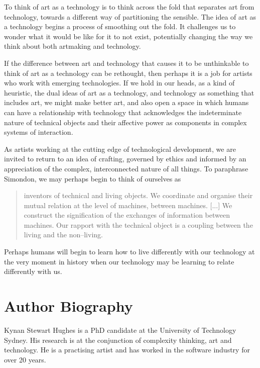 \documentclass[letter:wpaper]{article}
\begin{document}
   To think of art as a technology is to think across the fold that separates art from technology, towards a different way of partitioning the sensible. The idea of art as a technology begins a process of smoothing out the fold. It challenges us to wonder what it would be like for it to not exist, potentially changing the way we think about both artmaking and technology.
    
    If the difference between art and technology that causes it to be unthinkable to think of art as a technology can be rethought, then perhaps it is a job for artists who work with emerging technologies. If we hold in our heads, as a kind of heuristic, the dual ideas of art as a technology, and technology as something that includes art, we might make better art, and also open a space in which humans can have a relationship with technology that acknowledges the indeterminate nature of technical objects and their affective power as components in complex systems of interaction.
    
    As artists working at the cutting edge of technological development, we are invited to return to an idea of crafting, governed by ethics and informed by an appreciation of the complex, interconnected nature of all things. To paraphrase Simondon, we may perhaps begin to think of ourselves as
    
    \begin{quote}
        inventors of technical and living objects. We coordinate and organise their mutual relation at the level of machines, between machines. [...] We construct the signification of the exchanges of information between machines. Our rapport with the technical object is a coupling between the living and the non–living. \citep[p.xvi]{SimondonOnThMdOfExstncOfTechnclObjcts1980}
    \end{quote}

    Perhaps humans will begin to learn how to live differently with our technology at the very moment in history when our technology may be learning to relate differently with us.
    



\section{Author Biography}

Kynan Stewart Hughes is a PhD candidate at the University of Technology Sydney. His research is at the conjunction of complexity thinking, art and technology. He is a practising artist and has worked in the software industry for over 20 years. 
\end{document}
